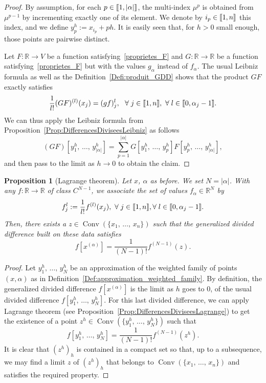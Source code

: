 \documentclass[11pt]{article}
\newtheorem{prop}[theo]{Proposition}
\theoremstyle{definition}
\numberwithin{equation}{section}
\numberwithin{figure}{section}
\numberwithin{table}{section}
\DeclareMathOperator{\Conv}{Conv}
\newcommand{\llbracket}{\mathopen{[\mkern -2.7mu[}}
\newcommand{\rrbracket}{\mathclose{]\mkern -2.7mu]}}
\newcommand{\inter}[2]{\llbracket #1,#2 \rrbracket}
\newcommand{\R}{\mathbb{R}}
\let\oldforall\forall
\renewcommand*{\forall}{\mathrel{\oldforall}}
\begin{document}
\begin{proof}
By assumption, for each $p\in \inter{1}{|\alpha|}$, the multi-index $\mu^{p}$ is obtained from $\mu^{p-1}$ by incrementing exactly one of its element. We denote by $i_p\in \inter{1}{n}$ this index, and we define $y_p^h:=x_{i_p}+ph$. It is easily seen that, for $h>0$ small enough, those points are pairwise distinct.

Let $F:\R\to V$ be a function satisfying~\eqref{proprietes_F} and $G:\R\to \R$ be a function satisfying~\eqref{proprietes_F} but with the values $g_{\alpha}$ instead of $f_{\alpha}$. The usual Leibniz formula as well as the Definition~\ref{Defi:produit_GDD} shows that the product $GF$ exactly satisfies
\[
\frac{1}{l!}(GF)^{(l)}(x_j) = (gf)_j^l, \ \ \forall j\in \inter{1}{n},\ \forall l\in \inter{0}{\alpha_j-1}.
\]
We can thus apply the Leibniz formula from Proposition~\ref{Prop:DifferencesDiviseesLeibniz} as follows
\[
(GF)\left[y_1^h,\,\dotsc,\,y_{|\alpha|}^h\right] = \sum_{p=1}^{|\alpha|} G\left[y_1^h,\,\dotsc,\,y_{p}^h\right] F\left[y_p^h,\,\dotsc,\,y_{|\alpha|}^h\right],
\]
and then pass to the limit as $h\to 0$ to obtain the claim.
\end{proof}
\pagebreak

\begin{prop}[Lagrange theorem]
Let $x$, $\alpha$ as before. We set $N=|\alpha|$. With any $f:\R\to \R$ of class $C^{N-1}$, we associate the set of values $f_\alpha\in \R^{N}$ by
\[
f_j^l:=\frac{1}{l!} f^{(l)}(x_j), \ \forall j\in \inter{1}{n}, \forall l\in \inter{0}{\alpha_j-1}.
\]
Then, there exists a $z\in \Conv(\{x_1,\,\dotsc,\,x_n\})$ such that the generalized divided difference built on these data satisfies
\[
f\left[x^{(\alpha)}\right] = \frac{1}{(N-1)!} f^{(N-1)}(z).
\]
\end{prop}

\begin{proof}
Let $y_1^h,\,\dotsc,\,y_N^h$ be an approximation of the weighted family of points $(x,\alpha)$ as in Definition~\ref{Def:approximation_weighted_family}. By definition, the generalized divided difference $f[x^{(\alpha)}]$ is the limit as $h$ goes to $0$, of the usual divided difference $f[y_1^h,\,\dotsc,\,y_N^h]$. For this last divided difference, we can apply Lagrange theorem (see Proposition~\ref{Prop:DifferencesDiviseesLagrange}) to get the existence of a point $z^h\in \Conv (\{y_1^h,\,\dotsc,\,y_N^h\})$ such that
\[
f\left[y_1^h,\,\dotsc,\,y_N^h\right]=\frac{1}{(N-1)!} f^{(N-1)}(z^h).
\]
It is clear that $(z^h)_h$ is contained in a compact set so that, up to a subsequence, we may find a limit $z$ of $(z^h)_h$ that belongs to $\Conv(\{x_1,\,\dotsc,\,x_n\})$ and satisfies the required property.
\end{proof}
\end{document}
